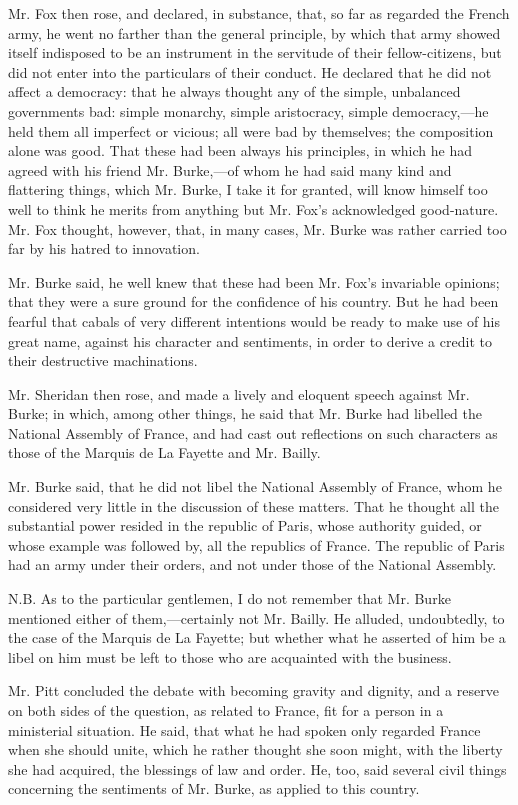 Mr. Fox then rose, and declared, in substance, that, so far as regarded the French army, he went no farther than the general principle, by which that army showed itself indisposed to be an instrument in the servitude of their fellow-citizens, but did not enter into the particulars of their conduct. He declared that he did not affect a democracy: that he always thought any of the simple, unbalanced governments bad: simple monarchy, simple aristocracy, simple democracy,—he held them all imperfect or vicious; all were bad by themselves; the composition alone was good. That these had been always his principles, in which he had agreed with his friend Mr. Burke,—of whom he had said many kind and flattering things, which Mr. Burke, I take it for granted, will know himself too well to think he merits from anything but Mr. Fox's acknowledged good-nature. Mr. Fox thought, however, that, in many cases, Mr. Burke was rather carried too far by his hatred to innovation.

Mr. Burke said, he well knew that these had been Mr. Fox's invariable opinions; that they were a sure ground for the confidence of his country. But he had been fearful that cabals of very different intentions would be ready to make use of his great name, against his character and sentiments, in order to derive a credit to their destructive machinations.

Mr. Sheridan then rose, and made a lively and eloquent speech against Mr. Burke; in which, among other things, he said that Mr. Burke had libelled the National Assembly of France, and had cast out reflections on such characters as those of the Marquis de La Fayette and Mr. Bailly.

Mr. Burke said, that he did not libel the National Assembly of France, whom he considered very little in the discussion of these matters. That he thought all the substantial power resided in the republic of Paris, whose authority guided, or whose example was followed by, all the republics of France. The republic of Paris had an army under their orders, and not under those of the National Assembly.

N.B. As to the particular gentlemen, I do not remember that Mr. Burke mentioned either of them,—certainly not Mr. Bailly. He alluded, undoubtedly, to the case of the Marquis de La Fayette; but whether what he asserted of him be a libel on him must be left to those who are acquainted with the business.

Mr. Pitt concluded the debate with becoming gravity and dignity, and a reserve on both sides of the question, as related to France, fit for a person in a ministerial situation. He said, that what he had spoken only regarded France when she should unite, which he rather thought she soon might, with the liberty she had acquired, the blessings of law and order. He, too, said several civil things concerning the sentiments of Mr. Burke, as applied to this country.

